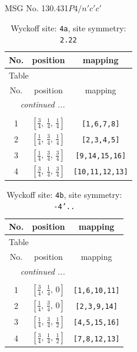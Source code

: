 \documentclass[fleqn,8pt]{jsarticle}
\begin{document}
\setcounter{MaxMatrixCols}{32}

\renewcommand{\tablename}{Table~}
\renewcommand{\figurename}{Figure~}
\begin{center}
\LARGE
MSG No. 130.431\quad$P4/n'c'c'$
\end{center}
\renewcommand{\arraystretch}{1.2}
\begin{longtable}{ccc}
\caption{Wyckoff site: {\tt 4a}, site symmetry: {\tt 2.22}}
 \\
 \hline \hline
No. & position & mapping \\ \hline \endfirsthead

\multicolumn{2}{l}{\tablename\ \thetable{}} \\
 \hline \hline
No. & position & mapping \\ \hline \endhead

 \hline \hline
\multicolumn{2}{r}{\footnotesize\it continued ...} \\ \endfoot

 \hline \hline
\multicolumn{2}{r}{} \\ \endlastfoot

1 & $\left[ \frac{3}{4},\, \frac{1}{4},\, \frac{1}{4} \right]$ & {\tt [1,6,7,8]} \\ \hline
2 & $\left[ \frac{1}{4},\, \frac{3}{4},\, \frac{1}{4} \right]$ & {\tt [2,3,4,5]} \\ \hline
3 & $\left[ \frac{1}{4},\, \frac{3}{4},\, \frac{3}{4} \right]$ & {\tt [9,14,15,16]} \\ \hline
4 & $\left[ \frac{3}{4},\, \frac{1}{4},\, \frac{3}{4} \right]$ & {\tt [10,11,12,13]} \\
\end{longtable}
\renewcommand{\arraystretch}{1.2}
\begin{longtable}{ccc}
\caption{Wyckoff site: {\tt 4b}, site symmetry: {\tt -4'..}}
 \\
 \hline \hline
No. & position & mapping \\ \hline \endfirsthead

\multicolumn{2}{l}{\tablename\ \thetable{}} \\
 \hline \hline
No. & position & mapping \\ \hline \endhead

 \hline \hline
\multicolumn{2}{r}{\footnotesize\it continued ...} \\ \endfoot

 \hline \hline
\multicolumn{2}{r}{} \\ \endlastfoot

1 & $\left[ \frac{3}{4},\, \frac{1}{4},\, 0 \right]$ & {\tt [1,6,10,11]} \\ \hline
2 & $\left[ \frac{1}{4},\, \frac{3}{4},\, 0 \right]$ & {\tt [2,3,9,14]} \\ \hline
3 & $\left[ \frac{1}{4},\, \frac{3}{4},\, \frac{1}{2} \right]$ & {\tt [4,5,15,16]} \\ \hline
4 & $\left[ \frac{3}{4},\, \frac{1}{4},\, \frac{1}{2} \right]$ & {\tt [7,8,12,13]} \\
\end{longtable}
\end{document}
